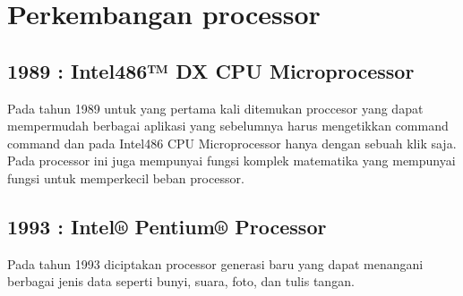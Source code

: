 \section{Perkembangan processor}
	\subsection{1989 : Intel486™ DX CPU Microprocessor}
	Pada tahun 1989 untuk yang pertama kali  ditemukan proccesor yang dapat mempermudah berbagai aplikasi yang sebelumnya harus mengetikkan command command dan pada Intel486 CPU Microprocessor hanya dengan sebuah klik saja. Pada processor ini juga mempunyai fungsi komplek matematika yang mempunyai fungsi untuk memperkecil beban processor.
	\subsection {1993 : Intel® Pentium® Processor}
	Pada tahun 1993 diciptakan processor generasi baru yang dapat menangani berbagai jenis data seperti bunyi, suara, foto, dan tulis tangan.